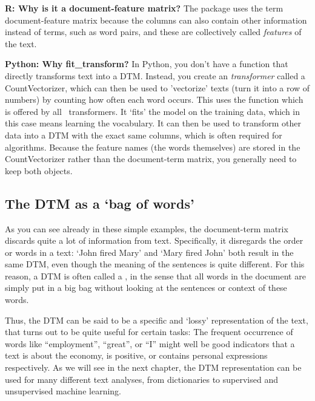 \begin{feature}
  \textbf{R: Why is it a document-feature matrix?}
The package  uses the term document-feature matrix because the columns can also contain
other information instead of terms, such as word pairs, and these are collectively called \emph{features} of the text.
\end{feature}

\begin{feature}
\noindent\textbf{Python: Why fit\_transform?}
In Python, you don't have a function that directly transforms text into a DTM.
Instead, you create an \emph{transformer} called a CountVectorizer,
which can then be used to 'vectorize' texts (turn it into a row of numbers)
by counting how often each word occurs.
This uses the  function which is offered by all \sklearn\ transformers.
It `fits' the model on the training data, which in this case means learning the vocabulary.
It can then be used to transform other data into a DTM with the exact same columns,
which is often required for algorithms.
Because the feature names (the words themselves) are stored in the CountVectorizer
rather than the document-term matrix, you generally need to keep both objects.
\end{feature}

\subsection{The DTM as a `bag of words'}


As you can see already in these simple examples, the document-term matrix discards quite a lot of information from text.
Specifically, it disregards the order or words in a text: `John fired Mary' and `Mary fired John' both result in the same DTM,
even though the meaning of the sentences is quite different.
For this reason, a DTM is often called a , in the sense that all words in the document are simply put in a big bag
without looking at the sentences or context of these words. 

Thus, the DTM can be said to be a specific and `lossy' representation of the text, that turns out to be quite useful for certain tasks:
The frequent occurrence of words like ``employment'', ``great'', or ``I'' might well be good indicators that a text is about the economy,
is positive, or contains personal expressions respectively.
As we will see in the next chapter, the DTM representation can be used for many different text analyses, from dictionaries to supervised and unsupervised machine learning.

